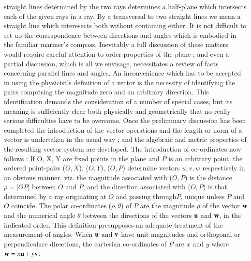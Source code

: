 straight lines determined by the two rays determines a half-plane
which intersects each of the given rays in a ray. By a transversal to
two straight lines we mean a straight line which interesects both
without containing either. It is not difficult to set up the
correspondence between directions and angles which is embodied in the
familiar mariner's compass. Inevitably a full discussion of these
matters would require careful attention to order properties of the
plane ; and even a partial discussion, which is all we envisage,
necessitates a review of facts concerning parallel lines and
angles. An inconvenience which has to be accepted  in using the
physicist's definition of a vector is the necessity of identifying the
pairs comprising the magnitude zero and an arbitrary direction. This
identification demands the consideration of a number of special cases,
but its meaning is sufficiently clear both physically and
geometrically that no really serious difficulties have to be
overcome. Once the preliminary discussion has been completed the
introduction of the vector operations and the length or norm of a
vector is undertaken in the usual way ; and the algebraic and metric
properties of the resulting vector-system are developed. The
introduction of co-ordinates now follows : If O, X, Y are fixed points
in the plane and $P$ is an arbitrary point, the ordered point-pairs
($O,X$), ($O,Y$), ($O,P$) determine vectors $u, v, w$ respectively in
an obvious manner, viz. the magnitude associated with ($O,P$) is the
distance $\rho = |OP|$ between $O$ and $P$, and the direction
associated with ($O,P$) is that determined by a ray originating at $O$
and passing through\pageoriginale $P$, unique unless $P$ and $O$ coincide. The polar
co-ordinates ($\rho, \theta$) of $P$ are the magnitude $\rho$ of the
vector $\mathbf{w}$ and the numerical angle $\theta$ between the directions
of the vectors $\mathbf{u}$ and $\mathbf{w}$, in the indicated order. This
definition presupposes an adequate treatment of the measurement of
angles. When $\mathbf{u}$ and $\mathbf{v}$ have unit magnitudes and orthogonal or
perpendiculare directions, the cartesian co-ordinates of $P$ are $x$
and $y$ where $\mathbf{w} = x \mathbf{u} + y \mathbf{v}$.

